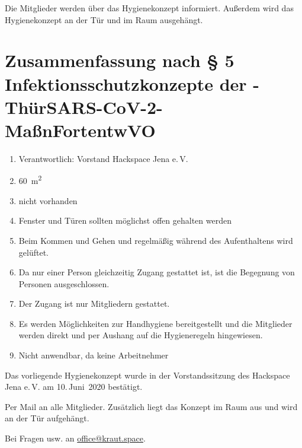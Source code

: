 \documentclass[a4paper,12pt,parskip=half]{scrartcl}
\begin{document}
Die Mitglieder werden über das Hygienekonzept informiert. Außerdem wird das Hygienekonzept an der Tür und im Raum ausgehängt.

\section*{Zusammenfassung nach § 5 Infektionsschutzkonzepte der -ThürSARS-CoV-2-
MaßnFortentwVO}
\begin{enumerate}
 \item Verantwortlich: Vorstand Hackspace Jena e.\,V.
 \item \SI{60}{\square\metre}
 \item nicht vorhanden
 \item Fenster und Türen sollten möglichst offen gehalten werden
 \item Beim Kommen und Gehen und regelmäßig während des Aufenthaltens wird gelüftet.
 \item Da nur einer Person gleichzeitig Zugang gestattet ist, ist die Begegnung von Personen ausgeschlossen.
 \item Der Zugang ist nur Mitgliedern gestattet.
 \item Es werden Möglichkeiten zur Handhygiene bereitgestellt und die Mitglieder werden direkt und per Aushang auf die Hygieneregeln hingewiesen.
 \item Nicht anwendbar, da keine Arbeitnehmer
\end{enumerate}

Das vorliegende Hygienekonzept wurde in der Vorstandssitzung des Hackspace Jena e.\,V. am 10.\,Juni~2020 bestätigt.

Per Mail an alle Mitglieder. Zusätzlich liegt das Konzept im Raum aus und wird an der Tür aufgehängt.

Bei Fragen usw. an \href{mailto:office@kraut.space}{office@kraut.space}.

\begin{versionhistory}
\end{versionhistory}
\end{document}
